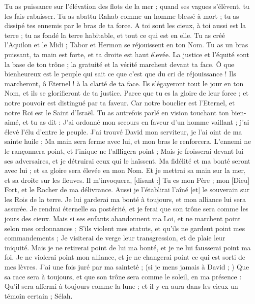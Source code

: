 \begin{multicols}{2}
Tu as puissance sur l'élévation des flots de la mer ; quand ses vagues s'élèvent, tu les fais rabaisser.
Tu as abattu Rahab comme un homme blessé à mort ; tu as dissipé tes ennemis par le bras de ta force.
A toi sont les cieux, à toi aussi est la terre ; tu as fondé la terre habitable, et tout ce qui est en elle.
Tu as créé l'Aquilon et le Midi ; Tabor et Hermon se réjouissent en ton Nom.
Tu as un bras puissant, ta main est forte, et ta droite est haut élevée.
La justice et l'équité sont la base de ton trône ; la gratuité et la vérité marchent devant ta face.
Ô que bienheureux est le peuple qui sait ce que c'est que du cri de réjouissance ! Ils marcheront, ô Eternel ! à la clarté de ta face.
Ils s'égayeront tout le jour en ton Nom, et ils se glorifieront de ta justice.
Parce que tu es la gloire de leur force ; et notre pouvoir est distingué par ta faveur.
Car notre bouclier est l'Eternel, et notre Roi est le Saint d'Israël.
Tu as autrefois parlé en vision touchant ton bien-aimé, et tu as dit : J'ai ordonné mon secours en faveur d'un homme vaillant ; j'ai élevé l'élu d'entre le peuple.
J'ai trouvé David mon serviteur, je l'ai oint de ma sainte huile ;
Ma main sera ferme avec lui, et mon bras le renforcera.
L'ennemi ne le rançonnera point, et l'inique ne l'affligera point ;
Mais je froisserai devant lui ses adversaires, et je détruirai ceux qui le haïssent.
Ma fidélité et ma bonté seront avec lui ; et sa gloire sera élevée en mon Nom.
Et je mettrai sa main sur la mer, et sa droite sur les fleuves.
Il m'invoquera, [disant :] Tu es mon Père ; mon [Dieu] Fort, et le Rocher de ma délivrance.
Aussi je l'établirai l'aîné [et] le souverain sur les Rois de la terre.
Je lui garderai ma bonté à toujours, et mon alliance lui sera assurée.
Je rendrai éternelle sa postérité, et je ferai que son trône sera comme les jours des cieux.
Mais si ses enfants abandonnent ma Loi, et ne marchent point selon mes ordonnances ;
S'ils violent mes statuts, et qu'ils ne gardent point mes commandements ;
Je visiterai de verge leur transgression, et de plaie leur iniquité.
Mais je ne retirerai point de lui ma bonté, et je ne lui fausserai point ma foi.
Je ne violerai point mon alliance, et je ne changerai point ce qui est sorti de mes lèvres.
J'ai une fois juré par ma sainteté ; (si je mens jamais à David ; )
Que sa race sera à toujours, et que son trône sera comme le soleil, en ma présence :
Qu'il sera affermi à toujours comme la lune ; et il y en aura dans les cieux un témoin certain ; Sélah.

\end{multicols}
